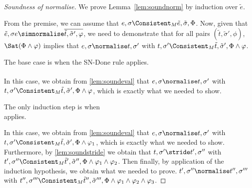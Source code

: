 \begin{proof}[Soundness of normalise]
  We prove Lemma~\ref{lem:soundnorm} by induction over $\tilde{e}$.

  From the premise, we can assume that $e,\sigma\Consistent_M\tilde{e},\tilde{\sigma},\Phi$.
  Now, given that $\tilde{e},\sigma{e}\simnormalise \overline{\tilde{t},\tilde{\sigma}',\phi}$,
  we need to demonstrate that for all pairs $(\tilde{t},\tilde{\sigma}',\phi)$,
  $\Sat(\Phi\land\phi)$ implies that $e,\sigma\normalise t,\sigma'$ with $t,\sigma'\Consistent_M\tilde{t},\tilde{\sigma}',\Phi\land\phi$.

The base case is when the SN-Done rule applies.\\
\\

In this case, we obtain from \cref{lem:soundeval} that
$e,\sigma\normalise t,\sigma'$ with $t,\sigma'\Consistent_M\tilde{t},\tilde{\sigma}',\Phi\land\phi$,
which is exactly what we needed to show.

The only induction step is when\\
 applies.

In this case, we obtain from \cref{lem:soundeval} that
$e,\sigma\normalise t,\sigma'$ with $t,\sigma'\Consistent_M\tilde{t},\tilde{\sigma}',\Phi\land\phi_1$,
which is exactly what we needed to show.
Furthermore, by \cref{lem:soundstride} we obtain that
$t,\sigma'\stride t',\sigma''$ with $t',\sigma''\Consistent_M\tilde{t}',\tilde{\sigma}'',\Phi\land\phi_1\land\phi_2$.
Then finally, by application of the induction hypothesis, we obtain what we needed to prove.
$t',\sigma''\normalise t'',\sigma'''$ with $t'',\sigma'''\Consistent_M\tilde{t}'',\tilde{\sigma}''',\Phi\land\phi_1\land\phi_2\land\phi_3$.

\end{proof}

